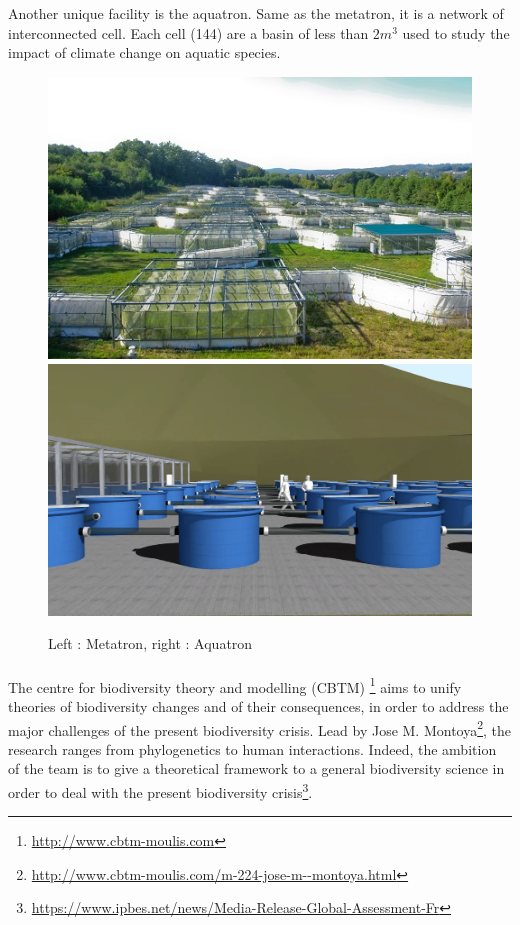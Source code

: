 \documentclass{article}
\begin{document}
Another unique facility is the aquatron. Same as the metatron, it is a network of interconnected cell. Each cell (144) are a basin of less than $2m^3$ used to study the impact of climate change on aquatic species.




\begin{figure}[h]
\begin{center}
\includegraphics[width=6.cm]{metatron_0.jpg}
\includegraphics[width=6.cm]{aquatron.png}
\end{center}
\caption{\label{fig:temp}Left : Metatron, right : Aquatron}
\end{figure}



\paragraph{}
The centre for biodiversity theory and modelling (CBTM) \footnote{\url{http://www.cbtm-moulis.com}} 
aims to unify theories of biodiversity changes and of their consequences, in order to address the major challenges of the present biodiversity crisis.
Lead by Jose M. Montoya\footnote{\url{http://www.cbtm-moulis.com/m-224-jose-m--montoya.html}}, the research ranges from phylogenetics to human interactions. Indeed, the ambition of the team is to give a theoretical framework to a general biodiversity science in order to deal with the present biodiversity crisis\footnote{\url{https://www.ipbes.net/news/Media-Release-Global-Assessment-Fr}}.
\end{document}

